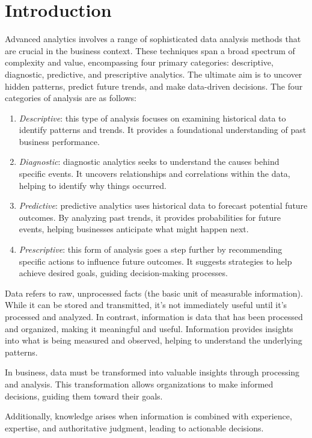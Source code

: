 \section{Introduction}

Advanced analytics involves a range of sophisticated data analysis methods that are crucial in the business context. 
These techniques span a broad spectrum of complexity and value, encompassing four primary categories: descriptive, diagnostic, predictive, and prescriptive analytics.
The ultimate aim is to uncover hidden patterns, predict future trends, and make data-driven decisions.
The four categories of analysis are as follows:
\begin{enumerate}
    \item \textit{Descriptive}: this type of analysis focuses on examining historical data to identify patterns and trends.
        It provides a foundational understanding of past business performance.
    \item \textit{Diagnostic}: diagnostic analytics seeks to understand the causes behind specific events. 
        It uncovers relationships and correlations within the data, helping to identify why things occurred.
    \item \textit{Predictive}: predictive analytics uses historical data to forecast potential future outcomes. 
        By analyzing past trends, it provides probabilities for future events, helping businesses anticipate what might happen next.
    \item \textit{Prescriptive}: this form of analysis goes a step further by recommending specific actions to influence future outcomes. 
        It suggests strategies to help achieve desired goals, guiding decision-making processes.
\end{enumerate}
\noindent Data refers to raw, unprocessed facts (the basic unit of measurable information). 
While it can be stored and transmitted, it's not immediately useful until it's processed and analyzed.
In contrast, information is data that has been processed and organized, making it meaningful and useful. 
Information provides insights into what is being measured and observed, helping to understand the underlying patterns.

In business, data must be transformed into valuable insights through processing and analysis. 
This transformation allows organizations to make informed decisions, guiding them toward their goals.

Additionally, knowledge arises when information is combined with experience, expertise, and authoritative judgment, leading to actionable decisions.

